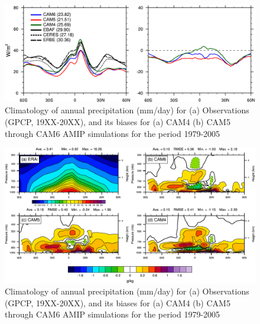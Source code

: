 \clearpage
\begin{figure}[t]
  \begin{center}
    \includegraphics[width=1.\textwidth,angle=0.]{./figs/f_LWCF_1D_ANN_CAM456.pdf}
  \end{center}
  \caption{Climatology of annual precipitation (mm/day) for (a) Observations (GPCP, 19XX-20XX), and its biases for (a) CAM4 (b) CAM5  through CAM6 AMIP simulations for the period 1979-2005} 
\label{f_LWCF_1D_ANN_CAM456}
\end{figure} 

\clearpage
\begin{figure}[t]
  \begin{center}
    \includegraphics[width=1.\textwidth,angle=0.]{./figs/f_MERRA_Q_latp_diff_ANN.pdf}
  \end{center}
  \caption{Climatology of annual precipitation (mm/day) for (a) Observations (GPCP, 19XX-20XX), and its biases for (a) CAM4 (b) CAM5  through CAM6 AMIP simulations for the period 1979-2005} 
\label{MERRA_Q_latp_diff_ANN}
\end{figure} 